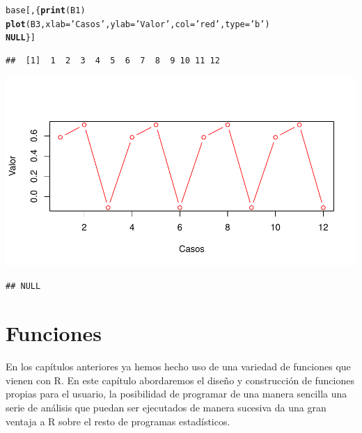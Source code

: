 \documentclass[11pt,a4paper,oneside]{book}\usepackage[]{graphicx}\usepackage[]{color}
\makeatletter
\def\maxwidth{ %
  \ifdim\Gin@nat@width>\linewidth
    \linewidth
  \else
    \Gin@nat@width
  \fi
}
\newcommand{\hlstr}[1]{\textcolor[rgb]{0.192,0.494,0.8}{#1}}%
\newcommand{\hlstd}[1]{\textcolor[rgb]{0.345,0.345,0.345}{#1}}%
\newcommand{\hlkwa}[1]{\textcolor[rgb]{0.161,0.373,0.58}{\textbf{#1}}}%
\newcommand{\hlkwc}[1]{\textcolor[rgb]{0.333,0.667,0.333}{#1}}%
\newcommand{\hlkwd}[1]{\textcolor[rgb]{0.737,0.353,0.396}{\textbf{#1}}}%
\newenvironment{kframe}{%
 \def\at@end@of@kframe{}%
 \ifinner\ifhmode%
  \def\at@end@of@kframe{\end{minipage}}%
  \begin{minipage}{\columnwidth}%
 \fi\fi%
 \def\FrameCommand##1{\hskip\@totalleftmargin \hskip-\fboxsep
 \colorbox{shadecolor}{##1}\hskip-\fboxsep
     \hskip-\linewidth \hskip-\@totalleftmargin \hskip\columnwidth}%
 \MakeFramed {\advance\hsize-\width
   \@totalleftmargin\z@ \linewidth\hsize
   \@setminipage}}%
 {\par\unskip\endMakeFramed%
 \at@end@of@kframe}
\newenvironment{knitrout}{}{} %
\makeatother
\begin{document}
\begin{itemize}
\begin{knitrout}
\color{fgcolor}\begin{kframe}
\begin{alltt}
\hlstd{base[,\{}\hlkwd{print}\hlstd{(B1)}
     \hlkwd{plot}\hlstd{(B3,} \hlkwc{xlab}\hlstd{=}\hlstr{'Casos'}\hlstd{,} \hlkwc{ylab}\hlstd{=}\hlstr{'Valor'}\hlstd{,} \hlkwc{col}\hlstd{=}\hlstr{'red'}\hlstd{,} \hlkwc{type}\hlstd{=}\hlstr{'b'}\hlstd{)}
     \hlkwa{NULL}\hlstd{\}]}
\end{alltt}
\begin{verbatim}
##  [1]  1  2  3  4  5  6  7  8  9 10 11 12
\end{verbatim}
\end{kframe}

{\centering \includegraphics[width=\maxwidth]{figure/unnamed-chunk-92-1} 

}


\begin{kframe}\begin{verbatim}
## NULL
\end{verbatim}
\end{kframe}
\end{knitrout}


\chapter{Funciones}

En los capítulos anteriores ya hemos hecho uso de una variedad de funciones que vienen con R. En este capítulo abordaremos el diseño y construcción de funciones propias para el usuario, la posibilidad de programar de una manera sencilla una serie de análisis que puedan ser ejecutados de manera sucesiva da una gran ventaja a R sobre el resto de programas estadísticos.\\


\end{itemize}
\end{document}
